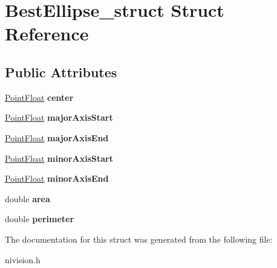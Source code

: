 \hypertarget{structBestEllipse__struct}{
\section{BestEllipse\_\-struct Struct Reference}
\label{structBestEllipse__struct}
}
\subsection*{Public Attributes}
\begin{DoxyCompactItemize}
\item 
\hypertarget{structBestEllipse__struct_a03e3166d6df99a4c69e41e926fb64aad}{
\hyperlink{structPointFloat__struct}{PointFloat} {\bfseries center}}
\label{structBestEllipse__struct_a03e3166d6df99a4c69e41e926fb64aad}

\item 
\hypertarget{structBestEllipse__struct_af9b280fedff09f6c9353c14fce91c4e2}{
\hyperlink{structPointFloat__struct}{PointFloat} {\bfseries majorAxisStart}}
\label{structBestEllipse__struct_af9b280fedff09f6c9353c14fce91c4e2}

\item 
\hypertarget{structBestEllipse__struct_ac3d7216961e264d9321da9fd1ea683ec}{
\hyperlink{structPointFloat__struct}{PointFloat} {\bfseries majorAxisEnd}}
\label{structBestEllipse__struct_ac3d7216961e264d9321da9fd1ea683ec}

\item 
\hypertarget{structBestEllipse__struct_a7cd0eca9d3f812233ca132cfbcb58eb9}{
\hyperlink{structPointFloat__struct}{PointFloat} {\bfseries minorAxisStart}}
\label{structBestEllipse__struct_a7cd0eca9d3f812233ca132cfbcb58eb9}

\item 
\hypertarget{structBestEllipse__struct_a323affeb5ac34894927e3e0d86f4ada8}{
\hyperlink{structPointFloat__struct}{PointFloat} {\bfseries minorAxisEnd}}
\label{structBestEllipse__struct_a323affeb5ac34894927e3e0d86f4ada8}

\item 
\hypertarget{structBestEllipse__struct_a58fcc35d1b8e23ccd5adeb35862397e6}{
double {\bfseries area}}
\label{structBestEllipse__struct_a58fcc35d1b8e23ccd5adeb35862397e6}

\item 
\hypertarget{structBestEllipse__struct_a8a0fbcca637f15b8a8abd4e867503073}{
double {\bfseries perimeter}}
\label{structBestEllipse__struct_a8a0fbcca637f15b8a8abd4e867503073}

\end{DoxyCompactItemize}


The documentation for this struct was generated from the following file:\begin{DoxyCompactItemize}
\item 
nivision.h\end{DoxyCompactItemize}
